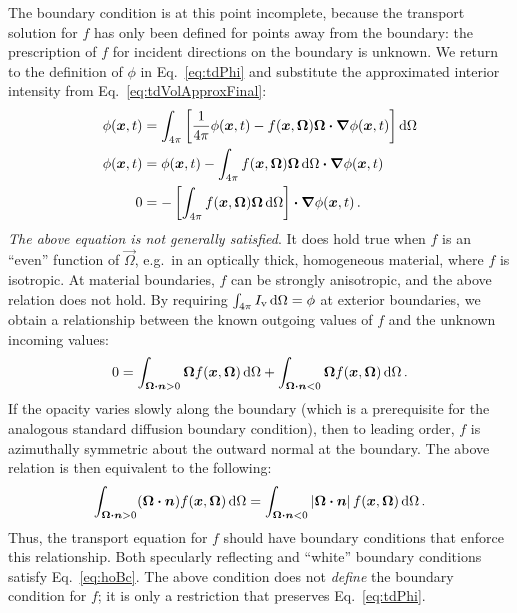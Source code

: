 The boundary condition is at this point incomplete, because the
transport
solution for $f$ has only been defined for points away from the boundary: the
prescription of $f$ for incident directions on the boundary is unknown.
We return to
the definition of $\phi$ in Eq.~\eqref{eq:tdPhi} and substitute the approximated
interior intensity from Eq.~\eqref{eq:tdVolApproxFinal}:
\begin{align*}
  \phi(\bm{x},t) &= \int_{4\pi} \left[ 
\frac{1}{4\pi} \phi (\bm{x},t)
  - f(\bm{x}, \bm{\Omega})\bm{\Omega}\bm{\cdot} \bm{\nabla} \phi(\bm{x},t)
  \right] \mathop{}\!\mathrm{d} \Omega
  \\
  \phi(\bm{x},t) &= \phi (\bm{x},t)
  - \int_{4\pi} f(\bm{x}, \bm{\Omega})\bm{\Omega} \mathop{}\!\mathrm{d} \Omega
  \bm{\cdot} \bm{\nabla} \phi(\bm{x},t)
  \\
  0 &= - \left[ \int_{4\pi} f(\bm{x}, \bm{\Omega})\bm{\Omega} \mathop{}\!\mathrm{d}\Omega
  \right]
  \bm{\cdot} \bm{\nabla} \phi(\bm{x},t) \,.
\end{align*}
\emph{The above equation is not generally satisfied}. It does hold true when
$f$ is an ``even'' function of $\vec{\Omega}$, e.g.\ in an optically thick,
homogeneous material, where $f$ is isotropic. At material
boundaries, $f$ can be strongly anisotropic, and the above relation does not
hold. By requiring $\int_{4\pi} I_\mathrm{v} \mathop{}\!\mathrm{d}\Omega = \phi$ at exterior
boundaries, we
obtain a relationship between the known outgoing values of $f$ and the
unknown incoming values:
\begin{equation*}
  0 =
  \int_{\bm{\Omega}\bm{\cdot}\bm{n} > 0} \bm{\Omega} f(\bm{x}, \bm{\Omega}) \mathop{}\!\mathrm{d} \Omega
 + \int_{\bm{\Omega}\bm{\cdot}\bm{n} < 0} \bm{\Omega} f(\bm{x}, \bm{\Omega}) \mathop{}\!\mathrm{d}
 \Omega\,.
\end{equation*}
If the opacity varies slowly along the boundary (which is a prerequisite for the
analogous standard diffusion boundary condition), then to leading order, $f$
is azimuthally symmetric about the outward normal at the boundary. The above
relation is then equivalent to the following:
\begin{equation}\label{eq:hoBc}
  \int_{\bm{\Omega}\bm{\cdot}\bm{n} > 0} (\bm{\Omega}\bm{\cdot} \bm{n})
  f(\bm{x}, \bm{\Omega}) \mathop{}\!\mathrm{d}\Omega
  =
  \int_{\bm{\Omega}\bm{\cdot}\bm{n} < 0} \left| \bm{\Omega}\bm{\cdot} \bm{n} \right|
  f(\bm{x}, \bm{\Omega}) \mathop{}\!\mathrm{d}\Omega \,.
\end{equation}
Thus, the transport equation for $f$ should have boundary conditions
that enforce this relationship. Both specularly reflecting and
``white'' boundary conditions satisfy Eq.~\eqref{eq:hoBc}.
The above condition does not \emph{define} the boundary condition for $f$; it
is only a restriction that preserves Eq.~\eqref{eq:tdPhi}.


